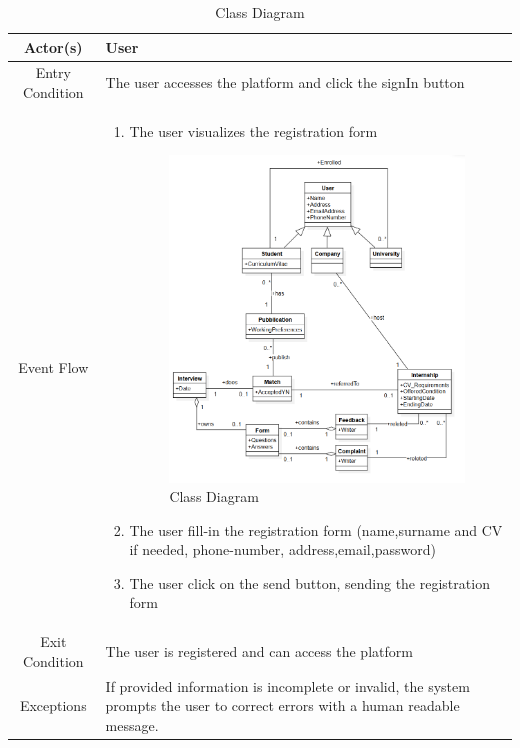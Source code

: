 \documentclass{article}
\begin{document}
\begin{table}[H]
    \centering
    \begin{tabular}{|c|p{10cm}|}
    \hline
        Actor(s)  & User\\ 
    \hline
        Entry Condition &  
        The user accesses the platform and click the signIn button\\
    \hline
        Event Flow &
        \begin{enumerate}
            \item The user visualizes the registration form
\begin{figure}
                \centering
                \includegraphics[width=0.5\linewidth]{ClassDiagram.png}
                \caption{Class Diagram}
                \label{fig:enter-label}
\end{figure}
                \item The user fill-in the registration form (name,surname and CV if needed, phone-number, address,email,password)
            \item The user click on the send button, sending the registration form
        \end{enumerate}
        \\
    \hline
        Exit Condition & The user is registered and can access the platform \\
    \hline
        Exceptions &  If provided information is incomplete or invalid, the system prompts the user to correct errors with a human readable message.\\
    \hline
    \end{tabular}
    \label{tab:my_label}
\end{table}
\end{document}
